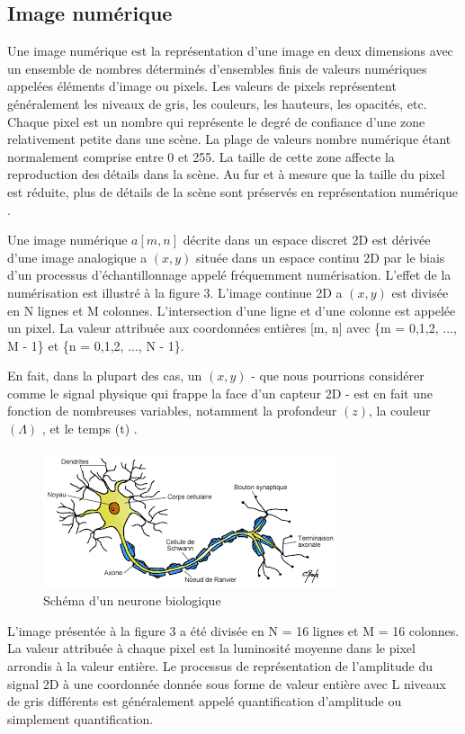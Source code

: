 \documentclass[12pt]{article}
\begin{document}
\subsection{Image numérique}
Une image numérique est la représentation d'une image en deux dimensions avec un ensemble de nombres déterminés d'ensembles finis de valeurs numériques appelées éléments d'image ou pixels. Les valeurs de pixels représentent généralement les niveaux de gris, les couleurs, les hauteurs, les opacités, etc. Chaque pixel est un nombre qui représente le degré de confiance d'une zone relativement petite dans une scène. La plage de valeurs nombre numérique étant normalement comprise entre 0 et 255. La taille de cette zone affecte la reproduction des détails dans la scène. Au fur et à mesure que la taille du pixel est réduite, plus de détails de la scène sont préservés en représentation numérique \cite{12}.

Une image numérique $a[m, n]$ décrite dans un espace discret 2D est dérivée d'une image analogique a $(x, y)$ située dans un espace continu 2D par le biais d'un processus d'échantillonnage appelé fréquemment numérisation. L'effet de la numérisation est illustré à la figure 3. L'image continue 2D a $(x, y)$ est divisée en N lignes et M colonnes. L'intersection d'une ligne et d'une colonne est appelée un pixel. La valeur attribuée aux coordonnées entières [m, n] avec \{m = 0,1,2, ..., M - 1\} et \{n = 0,1,2, ..., N - 1\}.

En fait, dans la plupart des cas, un $(x, y)$ - que nous pourrions considérer comme le signal physique qui frappe la face d’un capteur 2D - est en fait une fonction de nombreuses variables, notamment la profondeur $(z)$, la couleur $(\Lambda)$ ,  et le temps (t) \cite{13}.
\begin{figure}[h]
\centering
\includegraphics[scale=1]{img-Chapiter-1/neurone.png}
\caption{Schéma d’un neurone biologique}
\end{figure}

L'image présentée à la figure 3 a été divisée en N = 16 lignes et M = 16 colonnes. La valeur attribuée à chaque pixel est la luminosité moyenne dans le pixel arrondis à la valeur entière. Le processus de représentation de l'amplitude du signal 2D à une coordonnée donnée sous forme de valeur entière avec L niveaux de gris différents est généralement appelé quantification d'amplitude ou simplement quantification.
\end{document}
